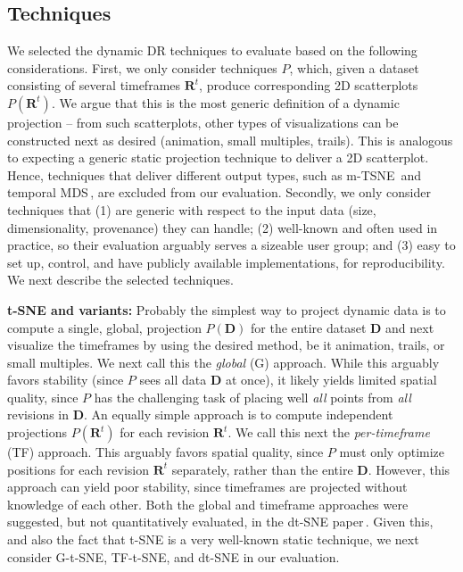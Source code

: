 \subsection{Techniques}
\label{subsec:techniques}
%
We selected the dynamic DR techniques to evaluate based on the following considerations. First, we only consider techniques $P$, which, given a dataset consisting of several timeframes $\mathbf{R}^t$, produce corresponding 2D scatterplots $P(\mathbf{R}^t)$. We argue that this is the most generic definition of a dynamic projection -- from such scatterplots, other types of visualizations can be constructed next as desired (animation, small multiples, trails). This is analogous to expecting a generic static projection technique to deliver a 2D scatterplot. Hence, techniques that deliver different output types, such as m-TSNE\,\cite{Nguyen2017} and temporal MDS\,\cite{Jackle2016}, are excluded from our evaluation. Secondly, we only consider techniques that (1) are generic with respect to the input data (size, dimensionality, provenance) they can handle; (2) well-known and often used in practice, so their evaluation arguably serves a sizeable user group; and (3) easy to set up, control, and have publicly available implementations, for reproducibility. We next describe the selected techniques.



\noindent\textbf{t-SNE and variants:} Probably the simplest way to project dynamic data is to compute a single, global, projection $P(\mathbf{D})$ for the entire dataset $\mathbf{D}$ and next visualize the timeframes by using the desired method, be it animation, trails, or small multiples. We next call this the \emph{global} (G) approach. While this arguably favors stability (since $P$ sees all data $\mathbf{D}$ at once), it likely yields limited spatial quality, since $P$ has the challenging task of placing well \emph{all} points from \emph{all} revisions in $\mathbf{D}$. An equally simple approach is to compute independent projections $P(\mathbf{R}^t)$ for each revision $\textbf{R}^t$. We call this next the \emph{per-timeframe} (TF) approach. This arguably favors spatial quality, since $P$ must only optimize positions for each revision $\mathbf{R}^t$ separately, rather than the entire $\mathbf{D}$. However, this approach can yield poor stability, since timeframes are projected without knowledge of each other. Both the global and timeframe approaches were suggested, but not quantitatively evaluated, in the dt-SNE paper\,\cite{Rauber2016}. Given this, and also the fact that t-SNE is a very well-known static technique, we next consider G-t-SNE, TF-t-SNE, and dt-SNE in our evaluation.

